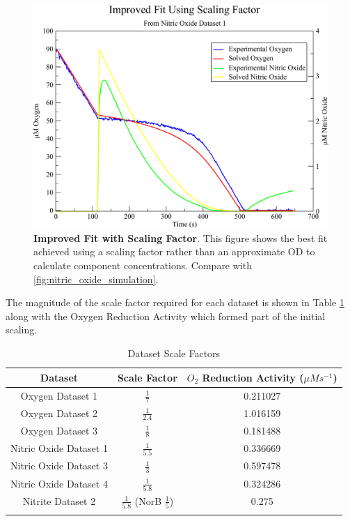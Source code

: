 \begin{figure}[tbp]
 \centering
 \includegraphics[width=15cm, clip=true]{./09-completedmodel/data/improved_fit.pdf}
 \caption[Improved Fit with Scaling Factor]{{\bf Improved Fit with Scaling Factor}. This figure shows the best fit achieved using a scaling factor rather than an approximate OD to calculate component concentrations. Compare with \ref{fig:nitric_oxide_simulation}.
 \label{fig:improved_fit}}
\end{figure}

The magnitude of the scale factor required for each dataset is shown in Table \ref{tab:scale-factors} along with the Oxygen Reduction Activity which formed part of the initial scaling.

\begin{table}[!ht]
\begin{center}
\begin{tabular}{ccc}
\toprule
Dataset & Scale Factor & $O_2$ Reduction Activity ($\mu Ms^{-1}$) \\
\midrule
Oxygen Dataset 1 & $\frac{1}{7}$ & 0.211027\\
\noalign{\smallskip}
Oxygen Dataset 2 & $\frac{1}{2.4}$ & 1.016159\\
\noalign{\smallskip}
Oxygen Dataset 3 & $\frac{1}{8}$ & 0.181488\\
\noalign{\smallskip}
Nitric Oxide Dataset 1 & $\frac{1}{5.5}$ & 0.336669\\
\noalign{\smallskip}
Nitric Oxide Dataset 3 & $\frac{1}{3}$ & 0.597478\\
\noalign{\smallskip}
Nitric Oxide Dataset 4 & $\frac{1}{5.8}$ & 0.324286\\
\noalign{\smallskip}
Nitrite Dataset 2 & $\frac{1}{5.8}$ (NorB $\frac{1}{5}$) & 0.275\\
\noalign{\smallskip}
\bottomrule
\end{tabular}
\end{center}
\caption{Dataset Scale Factors
\label{tab:scale-factors}}
\end{table}

